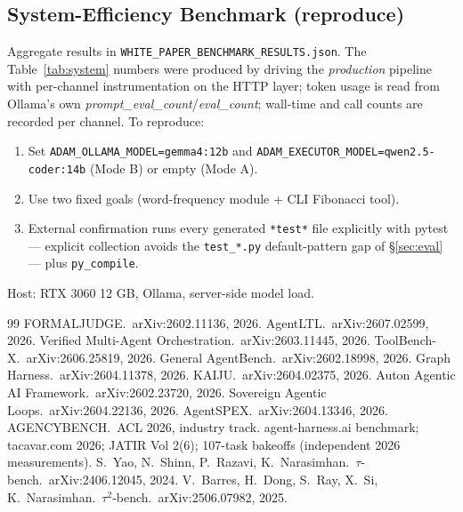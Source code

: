 \documentclass[11pt]{article}
\begin{document}
\begin{appendix}
\section[System-Efficiency Benchmark (reproduce)]{System-Efficiency Benchmark (reproduce)%
\label{app:bench}}
Aggregate results in
\texttt{WHITE\_PAPER\_BENCHMARK\_RESULTS.json}.
The Table~\ref{tab:system} numbers were produced by driving the \emph{production} pipeline
with per-channel instrumentation on the HTTP layer; token usage is read from Ollama's own
\emph{prompt\_eval\_count}/\emph{eval\_count}; wall-time and call counts are recorded per
channel. To reproduce:
\begin{enumerate}
  \item Set \texttt{ADAM\_OLLAMA\_MODEL=gemma4:12b} and
        \texttt{ADAM\_EXECUTOR\_MODEL=qwen2.5-coder:14b} (Mode B) or empty (Mode A).
  \item Use two fixed goals (word-frequency module + CLI Fibonacci tool).
  \item External confirmation runs every generated \texttt{*test*} file explicitly
        with pytest --- explicit collection avoids the \texttt{test\_*.py}
        default-pattern gap of \S\ref{sec:eval} --- plus \texttt{py\_compile}.
\end{enumerate}
Host: RTX 3060 12 GB, Ollama, server-side model load.
\end{appendix}

\begin{thebibliography}{99}
 FORMALJUDGE.\  arXiv:2602.11136, 2026.
 AgentLTL.\  arXiv:2607.02599, 2026.
 Verified Multi-Agent Orchestration.\  arXiv:2603.11445, 2026.
 ToolBench-X.\  arXiv:2606.25819, 2026.
 General AgentBench.\  arXiv:2602.18998, 2026.
 Graph Harness.\  arXiv:2604.11378, 2026.
 KAIJU.\  arXiv:2604.02375, 2026.
 Auton Agentic AI Framework.\  arXiv:2602.23720, 2026.
 Sovereign Agentic Loops.\  arXiv:2604.22136, 2026.
 AgentSPEX.\  arXiv:2604.13346, 2026.
 AGENCYBENCH.\  ACL 2026, industry track.
 agent-harness.ai benchmark; tacavar.com 2026; JATIR Vol 2(6); 107-task
  bakeoffs (independent 2026 measurements).
 S.~Yao, N.~Shinn, P.~Razavi, K.~Narasimhan.\  $\tau$-bench.\  arXiv:2406.12045,
  2024.
 V.~Barres, H.~Dong, S.~Ray, X.~Si, K.~Narasimhan.\  $\tau^2$-bench.\
  arXiv:2506.07982, 2025.
\end{thebibliography}
\end{document}
